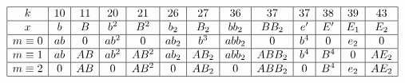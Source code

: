 \documentclass{article}
\begin{document}
\(
\begin{array}{|c|*{13}{c|}}
  \hline
  k & 10 & 11 & 20 & 21& 26 & 27 & 36 & 37 & 37 & 38 & 39 & 43 \\ \hline
  x & b & B & b^2 & B^2 & b_2 & B_2 & bb_2 & BB_2 & e' & E' & E_1 & E_2 \\ \hline
  m\equiv0 & ab & 0 & ab^2 & 0 & ab_2 & b^3 & abb_2 & 0 & b^4 & 0 & e_2 & 0 \\ \hline
  m\equiv1 & ab & AB & ab^2 & AB^2 & ab_2 & AB_2 & abb_2 & ABB_2 & b^4 & B^4 & 0 & AE_2 \\ \hline
  m\equiv2 & 0 & AB & 0 & AB^2 & 0 & AB_2 & 0 & ABB_2 & 0 & B^4 & e_2 & AE_2 \\ \hline
\end{array}
\)
\end{document}
